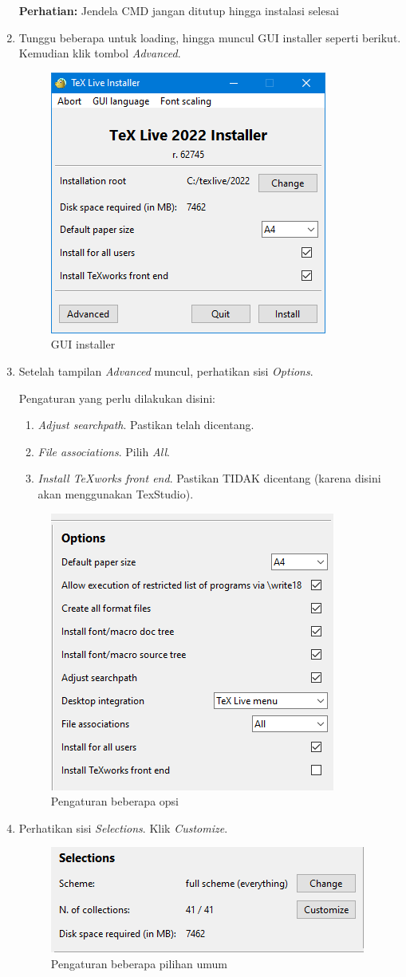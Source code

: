 \documentclass{book} %
\begin{document}
\begin{enumerate}
		\textbf{Perhatian:} Jendela CMD jangan ditutup hingga instalasi selesai

		\item Tunggu beberapa untuk loading, hingga muncul GUI installer seperti berikut.
		Kemudian klik tombol \textit{Advanced}.

		\begin{figure}[!ht]
			\centering
			\includegraphics[width=0.3\linewidth]{images/texlivewin3}
			\caption{GUI installer}
		\end{figure}

		\item Setelah tampilan \textit{Advanced} muncul, perhatikan sisi \textit{Options}.

		Pengaturan yang perlu dilakukan disini:
		\begin{enumerate}
			\item \textit{Adjust searchpath}. Pastikan telah dicentang.
			\item \textit{File associations}. Pilih \textit{All}.
			\item \textit{Install TeXworks front end}. Pastikan TIDAK dicentang (karena disini akan menggunakan TexStudio).
		\end{enumerate}

		\begin{figure}[!ht]
			\centering
			\includegraphics[width=0.3\linewidth]{images/texlivewin4}
			\caption{Pengaturan beberapa opsi}
		\end{figure}

		\newpage
		\item Perhatikan sisi \textit{Selections}. Klik \textit{Customize}.

		\begin{figure}[!ht]
			\centering
			\includegraphics[width=0.3\linewidth]{images/texlivewin5}
			\caption{Pengaturan beberapa pilihan umum}
		\end{figure}


\end{enumerate}
\end{document}
